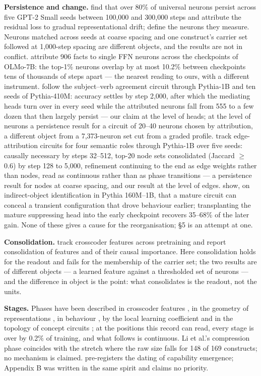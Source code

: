 \documentclass{article}
\begin{document}
\textbf{Persistence and change.} \citet{nandan2025} find that over 80\% of universal neurons persist across five GPT-2 Small seeds between 100,000 and 300,000 steps and attribute the residual loss to gradual representational drift; \citet{gurnee2024} define the neurons they measure. Neurons matched across seeds at coarse spacing and one construct's carrier set followed at 1,000-step spacing are different objects, and the results are not in conflict. \citet{wang2026} attribute 906 facts to single FFN neurons across the checkpoints of OLMo-7B: the top-1\% neurons overlap by at most 10.2\% between checkpoints tens of thousands of steps apart --- the nearest reading to ours, with a different instrument. \citet{yao2026b} follow the subject--verb agreement circuit through Pythia-1B and ten seeds of Pythia-410M: accuracy settles by step 2,000, after which the mediating heads turn over in every seed while the attributed neurons fall from 555 to a few dozen that then largely persist --- our claim at the level of heads; at the level of neurons a persistence result for a circuit of 20--40 neurons chosen by attribution, a different object from a 7,373-neuron set cut from a graded profile. \citet{aljaafari2026} track edge-attribution circuits for four semantic roles through Pythia-1B over five seeds: causally necessary by steps 32--512, top-20 node sets consolidated (Jaccard $\geq$ 0.6) by step 128 to 5,000, refinement continuing to the end as edge weights rather than nodes, read as continuous rather than as phase transitions --- a persistence result for nodes at coarse spacing, and our result at the level of edges. \citet{dahiya2026} show, on indirect-object identification in Pythia 160M--1B, that a mature circuit can conceal a transient configuration that drove behaviour earlier; transplanting the mature suppressing head into the early checkpoint recovers 35--68\% of the later gain. None of these gives a cause for the reorganisation; \S5 is an attempt at one.

\textbf{Consolidation.} \citet{bayazit2026} track crosscoder features across pretraining and report consolidation of features and of their causal importance. Here consolidation holds for the readout and fails for the membership of the carrier set; the two results are of different objects --- a learned feature against a thresholded set of neurons --- and the difference in object is the point: what consolidates is the readout, not the units.

\textbf{Stages.} Phases have been described in crosscoder features \citep{ge2026}, in the geometry of representations \citep{li2025}, in behaviour \citep{michaelov2025,chen2024}, by the local learning coefficient \citep{hoogland2025} and in the topology of concept circuits \citep{yao2026}; at the positions this record can read, every stage is over by 0.2\% of training, and what follows is continuous. Li et al.'s compression phase coincides with the stretch where the raw size falls for 148 of 169 constructs; no mechanism is claimed. \citet{howe2026} pre-registers the dating of capability emergence; Appendix B was written in the same spirit and claims no priority.
\end{document}
